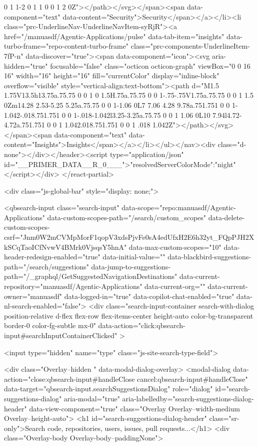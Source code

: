 {{0 1 1-2 0 1 1 0 0 1 2 0Z"></path></svg></span><span data-component="text" data-content="Security">Security</span></a></li><li class="prc-UnderlineNav-UnderlineNavItem-syRjR"><a href="/manuasdf/Agentic-Applications/pulse" data-tab-item="insights" data-turbo-frame="repo-content-turbo-frame" class="prc-components-UnderlineItem-7fP-n" data-discover="true"><span data-component="icon"><svg aria-hidden="true" focusable="false" class="octicon octicon-graph" viewBox="0 0 16 16" width="16" height="16" fill="currentColor" display="inline-block" overflow="visible" style="vertical-align:text-bottom"><path d="M1.5 1.75V13.5h13.75a.75.75 0 0 1 0 1.5H.75a.75.75 0 0 1-.75-.75V1.75a.75.75 0 0 1 1.5 0Zm14.28 2.53-5.25 5.25a.75.75 0 0 1-1.06 0L7 7.06 4.28 9.78a.751.751 0 0 1-1.042-.018.751.751 0 0 1-.018-1.042l3.25-3.25a.75.75 0 0 1 1.06 0L10 7.94l4.72-4.72a.751.751 0 0 1 1.042.018.751.751 0 0 1 .018 1.042Z"></path></svg></span><span data-component="text" data-content="Insights">Insights</span></a></li></ul></nav><div class="d-none"></div></header><script type="application/json" id="__PRIMER_DATA__R_0___">{"resolvedServerColorMode":"night"}</script></div>
</react-partial>


      <div class="js-global-bar" style="display: none;">
        


<qbsearch-input class="search-input" data-scope="repo:manuasdf/Agentic-Applications" data-custom-scopes-path="/search/custom_scopes" data-delete-custom-scopes-csrf="Jnm0W2mCVMpMorF1qopV3xdsPjvFe0sA4edUfxH2E6h32yt_FQpPJH2XkSCqTaoICfNvwV4BMrk0VjsqsY5hnA" data-max-custom-scopes="10" data-header-redesign-enabled="true" data-initial-value="" data-blackbird-suggestions-path="/search/suggestions" data-jump-to-suggestions-path="/_graphql/GetSuggestedNavigationDestinations" data-current-repository="manuasdf/Agentic-Applications" data-current-org="" data-current-owner="manuasdf" data-logged-in="true" data-copilot-chat-enabled="true" data-nl-search-enabled="false">
  <div
    class="search-input-container search-with-dialog position-relative d-flex flex-row flex-items-center height-auto color-bg-transparent border-0 color-fg-subtle mx-0"
    data-action="click:qbsearch-input#searchInputContainerClicked"
  >

    <input type="hidden" name="type" class="js-site-search-type-field">

    
<div class="Overlay--hidden " data-modal-dialog-overlay>
  <modal-dialog data-action="close:qbsearch-input#handleClose cancel:qbsearch-input#handleClose" data-target="qbsearch-input.searchSuggestionsDialog" role="dialog" id="search-suggestions-dialog" aria-modal="true" aria-labelledby="search-suggestions-dialog-header" data-view-component="true" class="Overlay Overlay--width-medium Overlay--height-auto">
      <h1 id="search-suggestions-dialog-header" class="sr-only">Search code, repositories, users, issues, pull requests...</h1>
    <div class="Overlay-body Overlay-body--paddingNone">
      
}}

